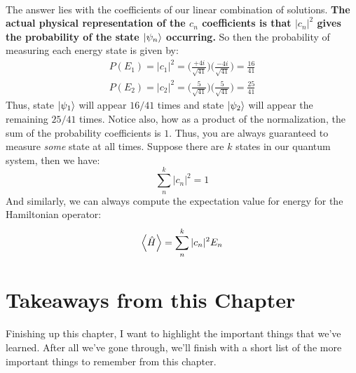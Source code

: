 \documentclass[12pt,letterpaper]{book}
\begin{document}
\paragraph*{}The answer lies with the coefficients of our linear combination of solutions. \textbf{The actual physical representation of the $c_n$ coefficients is that $|c_n|^2$ gives the probability of the state $\ket{\psi_n}$ occurring.} So then the probability of measuring each energy state is given by:
\begin{equation}
\begin{split}
P(E_1) = |c_1|^2 = \Big(\frac{+4i}{\sqrt{41}}\Big) \Big(\frac{-4i}{\sqrt{41}}\Big) = \frac{16}{41} \\
P(E_2) = |c_2|^2 = \Big(\frac{5}{\sqrt{41}}\Big) \Big(\frac{5}{\sqrt{41}}\Big) = \frac{25}{41}
\end{split}
\end{equation}
Thus, state $\ket{\psi_1}$ will appear $16/41$ times and state $\ket{\psi_2}$ will appear the remaining $25/41$ times. Notice also, how as a product of the normalization, the sum of the probability coefficients is $1$. Thus, you are always guaranteed to measure \textit{some} state at all times. Suppose there are $k$ states in our quantum system, then we have:
\begin{equation}
\sum_n^k |c_n|^2 = 1
\end{equation}
And similarly, we can always compute the expectation value for energy for the Hamiltonian operator:
\begin{equation}
\label{expect Hamiltionian}
\expval{\hat{H}} = \sum_n^k |c_n|^2 E_n
\end{equation}


\section{Takeaways from this Chapter}
\paragraph*{}Finishing up this chapter, I want to highlight the important things that we've learned. After all we've gone through, we'll finish with a short list of the more important things to remember from this chapter.

\end{document}
